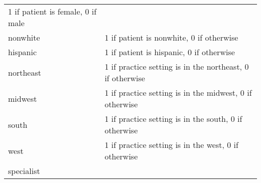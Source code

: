 \documentclass[
]{book}
\begin{document}
\begin{longtable}[]{@{}ll@{}}
\begin{minipage}[t]{0.76\columnwidth}
1 if patient is female, 0 if male\strut
\end{minipage}\tabularnewline
\begin{minipage}[t]{0.18\columnwidth}\raggedright
nonwhite\strut
\end{minipage} & \begin{minipage}[t]{0.76\columnwidth}\raggedright
1 if patient is nonwhite, 0 if otherwise\strut
\end{minipage}\tabularnewline
\begin{minipage}[t]{0.18\columnwidth}\raggedright
hispanic\strut
\end{minipage} & \begin{minipage}[t]{0.76\columnwidth}\raggedright
1 if patient is hispanic, 0 if otherwise\strut
\end{minipage}\tabularnewline
\begin{minipage}[t]{0.18\columnwidth}\raggedright
northeast\strut
\end{minipage} & \begin{minipage}[t]{0.76\columnwidth}\raggedright
1 if practice setting is in the northeast, 0 if otherwise\strut
\end{minipage}\tabularnewline
\begin{minipage}[t]{0.18\columnwidth}\raggedright
midwest\strut
\end{minipage} & \begin{minipage}[t]{0.76\columnwidth}\raggedright
1 if practice setting is in the midwest, 0 if otherwise\strut
\end{minipage}\tabularnewline
\begin{minipage}[t]{0.18\columnwidth}\raggedright
south\strut
\end{minipage} & \begin{minipage}[t]{0.76\columnwidth}\raggedright
1 if practice setting is in the south, 0 if otherwise\strut
\end{minipage}\tabularnewline
\begin{minipage}[t]{0.18\columnwidth}\raggedright
west\strut
\end{minipage} & \begin{minipage}[t]{0.76\columnwidth}\raggedright
1 if practice setting is in the west, 0 if otherwise\strut
\end{minipage}\tabularnewline
\begin{minipage}[t]{0.18\columnwidth}\raggedright
specialist\strut
\end{minipage} & \begin{minipage}[t]{0.76\columnwidth}\raggedright

\end{minipage}
\end{longtable}
\end{document}
